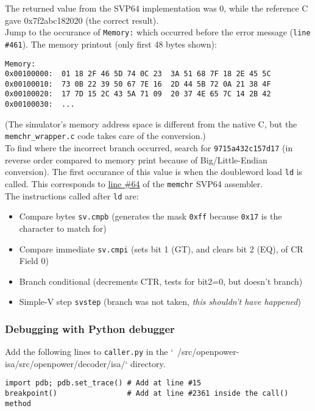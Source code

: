 The returned value from the SVP64 implementation was 0, while the reference C
gave 0x7f2abc182020 (the correct result).\\

Jump to the occurance of \texttt{Memory:} which occurred before the error
message (\texttt{line \#461}). The memory printout (only first 48 bytes shown):
\begin{verbatim}
Memory:
0x00100000:  01 18 2F 46 5D 74 0C 23  3A 51 68 7F 18 2E 45 5C
0x00100010:  73 0B 22 39 50 67 7E 16  2D 44 5B 72 0A 21 38 4F
0x00100020:  17 7D 15 2C 43 5A 71 09  20 37 4E 65 7C 14 2B 42
0x00100030:  ...
\end{verbatim}

(The simulator's memory address space is different from the native C,
but the \texttt{memchr\_wrapper.c} code takes care of the conversion.)\\

To find where the incorrect branch occurred, search for
\texttt{9715a432c157d17} (in reverse order compared to memory print because of
Big/Little-Endian conversion). The first occurance of this value is when
the doubleword load \texttt{ld} is called. This corresponds to
\href{https://git.vantosh.com/ngisearch/glibc-svp64/src/commit/1afb94889b8ea2f85844e410f87e5a9b8e2e959f/svp64-port/svp64/memchr_svp64.s#L64}{line \#64}
of the \texttt{memchr} SVP64 assembler.\\

The instructions called after \texttt{ld} are:

\begin{itemize}
  \item Compare bytes \texttt{sv.cmpb} (generates the mask \texttt{0xff}
        because \texttt{0x17} is the character to match for)
  \item Compare immediate \texttt{sv.cmpi} (sets bit 1 (GT), and clears
        bit 2 (EQ), of CR Field 0)
  \item Branch conditional (decrements CTR, tests for bit2=0, but
        doesn't branch)
  \item Simple-V step \texttt{svstep} (branch was not taken,
        \textit{this shouldn't have happened})
\end{itemize}

\subsubsection{Debugging with Python debugger}

Add the following lines to \texttt{caller.py} in the
`~/src/openpower-isa/src/openpower/decoder/isa/` directory.
\begin{verbatim}
import pdb; pdb.set_trace() # Add at line #15
breakpoint()                # Add at line #2361 inside the call() method
\end{verbatim}

